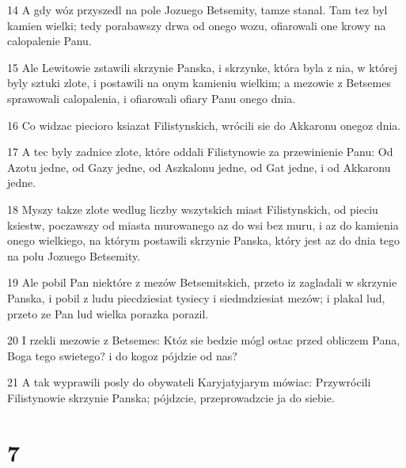 \par 14 A gdy wóz przyszedl na pole Jozuego Betsemity, tamze stanal. Tam tez byl kamien wielki; tedy porabawszy drwa od onego wozu, ofiarowali one krowy na calopalenie Panu.
\par 15 Ale Lewitowie zstawili skrzynie Panska, i skrzynke, która byla z nia, w której byly sztuki zlote, i postawili na onym kamieniu wielkim; a mezowie z Betsemes sprawowali calopalenia, i ofiarowali ofiary Panu onego dnia.
\par 16 Co widzac piecioro ksiazat Filistynskich, wrócili sie do Akkaronu onegoz dnia.
\par 17 A tec byly zadnice zlote, które oddali Filistynowie za przewinienie Panu: Od Azotu jedne, od Gazy jedne, od Aszkalonu jedne, od Gat jedne, i od Akkaronu jedne.
\par 18 Myszy takze zlote wedlug liczby wszytskich miast Filistynskich, od pieciu ksiestw, poczawszy od miasta murowanego az do wsi bez muru, i az do kamienia onego wielkiego, na którym postawili skrzynie Panska, który jest az do dnia tego na polu Jozuego Betsemity.
\par 19 Ale pobil Pan niektóre z mezów Betsemitskich, przeto iz zagladali w skrzynie Panska, i pobil z ludu piecdziesiat tysiecy i siedmdziesiat mezów; i plakal lud, przeto ze Pan lud wielka porazka porazil.
\par 20 I rzekli mezowie z Betsemes: Któz sie bedzie mógl ostac przed obliczem Pana, Boga tego swietego? i do kogoz pójdzie od nas?
\par 21 A tak wyprawili posly do obywateli Karyjatyjarym mówiac: Przywrócili Filistynowie skrzynie Panska; pójdzcie, przeprowadzcie ja do siebie.

\chapter{7}

